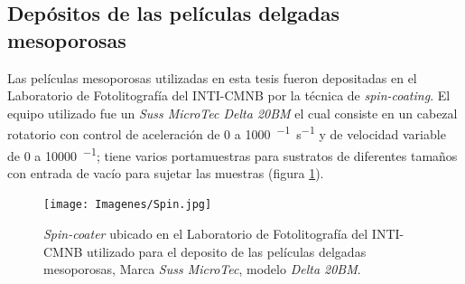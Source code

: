 	\subsection{Depósitos de las películas delgadas mesoporosas}\label{sec:deposito_pdm}

			Las películas mesoporosas utilizadas en esta tesis fueron depositadas en el Laboratorio de Fotolitografía del INTI-CMNB por la técnica de \textit{spin-coating}. El equipo utilizado fue un \textit{Suss MicroTec Delta 20BM} el cual consiste en un cabezal rotatorio con control de aceleración de 0 a  \SI{1000}{\min^{-1}.\second^{-1}} y de velocidad variable de 0 a  \SI{10000}{\min^{-1}}; tiene varios portamuestras para sustratos de diferentes tamaños con entrada de vacío para sujetar las muestras (figura \ref{fig:spin}). 
					  \begin{figure}[ht]
					  \begin{center}
					  \texttt{[image: Imagenes/Spin.jpg]}
					  \caption[Equipo para el depósito de películas delgadas, \textit{spin-coater}]{\textit{Spin-coater} ubicado en el Laboratorio de Fotolitografía del INTI-CMNB utilizado para el deposito de las películas delgadas mesoporosas, Marca \textit{Suss MicroTec}, modelo \textit{Delta 20BM}.}
					  \label{fig:spin}
					  \end{center}
					  \end{figure}

